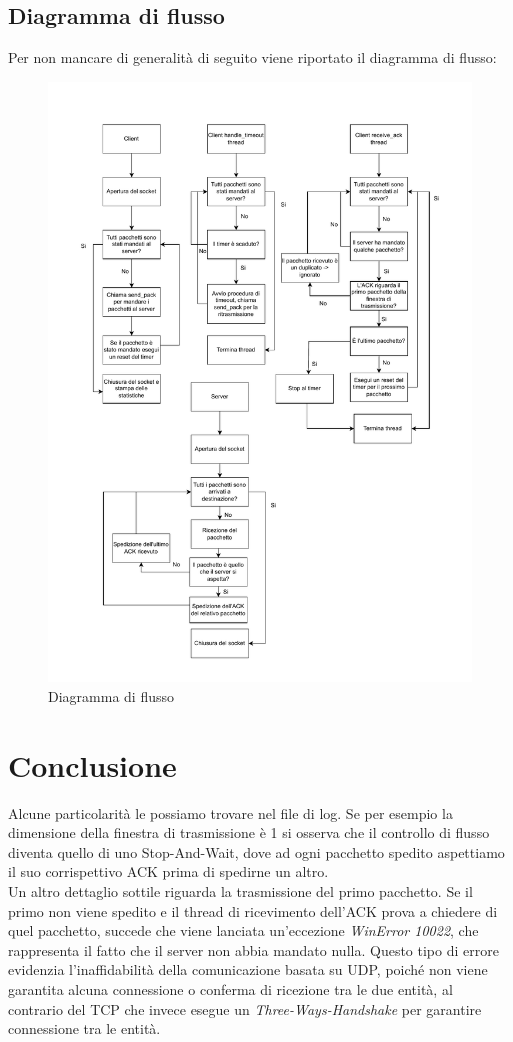 \documentclass[a4paper,12pt]{report}
\begin{document}
\section{Diagramma di flusso}
Per non mancare di generalità di seguito viene riportato il diagramma di flusso:
\begin{figure}
  \centering
  \includegraphics[width=1\textwidth]{img/GoBackN.pdf}
  \caption{Diagramma di flusso}
  \label{fig:client}
\end{figure}


\chapter{Conclusione}
Alcune particolarità le possiamo trovare nel file di log.
Se per esempio la dimensione della finestra di trasmissione è 1
si osserva che il controllo di flusso diventa quello di
uno Stop-And-Wait, dove ad ogni pacchetto spedito aspettiamo il suo 
corrispettivo ACK prima di spedirne un altro.\\
Un altro dettaglio sottile riguarda la trasmissione del primo pacchetto.
Se il primo non viene spedito e il thread di ricevimento dell'ACK prova
a chiedere di quel pacchetto, succede che viene lanciata un'eccezione
\textit{WinError 10022}, che rappresenta il fatto che il server non abbia mandato nulla.
Questo tipo di errore evidenzia l’inaffidabilità della 
comunicazione basata su UDP, poiché non viene garantita 
alcuna connessione o conferma di ricezione tra le due entità, al contrario del TCP che invece
esegue un \textit{Three-Ways-Handshake} per garantire connessione tra le entità.
\end{document}

